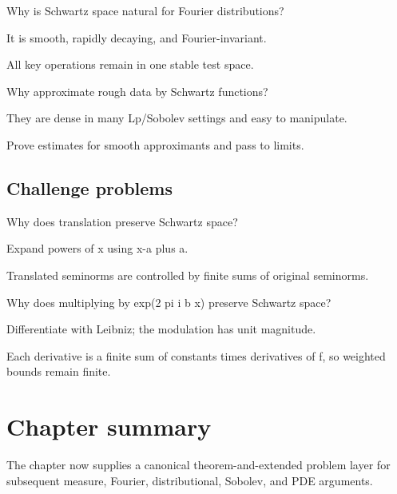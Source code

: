 \begin{exercise}\label{exr:iii14-expand-13}
Why is Schwartz space natural for Fourier distributions?
\end{exercise}
\begin{hint}
It is smooth, rapidly decaying, and Fourier-invariant.
\end{hint}
\begin{solution}
All key operations remain in one stable test space.
\end{solution}

\begin{exercise}[Regularization]\label{exr:iii14-expand-14}
Why approximate rough data by Schwartz functions?
\end{exercise}
\begin{hint}
They are dense in many Lp/Sobolev settings and easy to manipulate.
\end{hint}
\begin{solution}
Prove estimates for smooth approximants and pass to limits.
\end{solution}

\subsection*{Challenge problems}

\begin{exercise}[Translation]\label{exr:iii14-expand-15}
Why does translation preserve Schwartz space?
\end{exercise}
\begin{hint}
Expand powers of x using x-a plus a.
\end{hint}
\begin{solution}
Translated seminorms are controlled by finite sums of original seminorms.
\end{solution}

\begin{exercise}[Modulation]\label{exr:iii14-expand-16}
Why does multiplying by exp(2 pi i b x) preserve Schwartz space?
\end{exercise}
\begin{hint}
Differentiate with Leibniz; the modulation has unit magnitude.
\end{hint}
\begin{solution}
Each derivative is a finite sum of constants times derivatives of f, so weighted bounds remain finite.
\end{solution}
\section*{Chapter summary}
The chapter now supplies a canonical theorem-and-extended problem layer for subsequent measure, Fourier, distributional, Sobolev, and PDE arguments.
